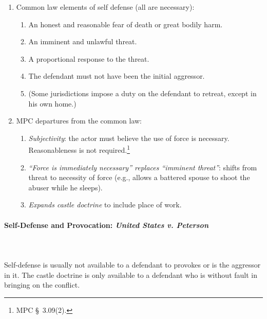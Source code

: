 \begin{enumerate}
    \item Common law elements of self defense (all are necessary):
    \begin{enumerate}
        \item An honest and reasonable fear of death or great bodily harm.
        \item An imminent and unlawful threat.
        \item A proportional response to the threat.
        \item The defendant must not have been the initial aggressor.
        \item (Some jurisdictions impose a duty on the defendant to retreat, 
        except in his own home.)
    \end{enumerate}
    \item MPC departures from the common law:
    \begin{enumerate}
        \item \emph{Subjectivity}: the actor must believe the use of force is 
        necessary. Reasonableness is not required.\footnote{MPC \S\ 3.09(2).}
        \item \emph{``Force is immediately necessary'' replaces 
        ``imminent threat''}: shifts from threat to necessity of force (e.g., 
        allows a battered spouse to shoot the abuser while he sleeps).
        \item \emph{Expands castle doctrine} to include place of work.
    \end{enumerate}
    
\end{enumerate}

\paragraph{Self-Defense and Provocation: \emph{United States v. Peterson}}
~\\\\
Self-defense is usually not available to a defendant to provokes or is the 
aggressor in it. The castle doctrine is only available to a defendant who is 
without fault in bringing on the conflict.

